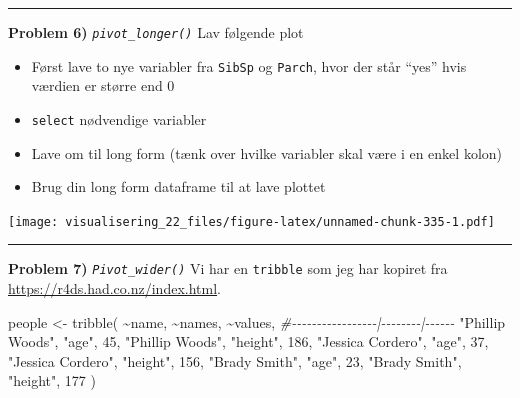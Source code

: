 \documentclass[
]{book}
\newenvironment{Shaded}{\begin{snugshade}}{\end{snugshade}}
\newcommand{\CommentTok}[1]{\textcolor[rgb]{0.56,0.35,0.01}{\textit{#1}}}
\newcommand{\DecValTok}[1]{\textcolor[rgb]{0.00,0.00,0.81}{#1}}
\newcommand{\FunctionTok}[1]{\textcolor[rgb]{0.00,0.00,0.00}{#1}}
\newcommand{\NormalTok}[1]{#1}
\newcommand{\OtherTok}[1]{\textcolor[rgb]{0.56,0.35,0.01}{#1}}
\newcommand{\SpecialCharTok}[1]{\textcolor[rgb]{0.00,0.00,0.00}{#1}}
\newcommand{\StringTok}[1]{\textcolor[rgb]{0.31,0.60,0.02}{#1}}
\providecommand{\tightlist}{%
  \setlength{\itemsep}{0pt}\setlength{\parskip}{0pt}}
\begin{document}
\begin{center}\rule{0.5\linewidth}{0.5pt}\end{center}

\textbf{Problem 6)} \emph{\texttt{pivot\_longer()}} Lav følgende plot

\begin{itemize}
\tightlist
\item
  Først lave to nye variabler fra \texttt{SibSp} og \texttt{Parch}, hvor der står ``yes'' hvis værdien er større end 0
\item
  \texttt{select} nødvendige variabler
\item
  Lave om til long form (tænk over hvilke variabler skal være i en enkel kolon)
\item
  Brug din long form dataframe til at lave plottet
\end{itemize}

\texttt{[image: visualisering\_22\_files/figure-latex/unnamed-chunk-335-1.pdf]}

\begin{center}\rule{0.5\linewidth}{0.5pt}\end{center}

\textbf{Problem 7)} \emph{\texttt{Pivot\_wider()}} Vi har en \texttt{tribble} som jeg har kopiret fra \url{https://r4ds.had.co.nz/index.html}.

\begin{Shaded}
\begin{Highlighting}[]
\NormalTok{people }\OtherTok{\textless{}{-}} \FunctionTok{tribble}\NormalTok{(}
  \SpecialCharTok{\textasciitilde{}}\NormalTok{name,             }\SpecialCharTok{\textasciitilde{}}\NormalTok{names,  }\SpecialCharTok{\textasciitilde{}}\NormalTok{values,}
  \CommentTok{\#{-}{-}{-}{-}{-}{-}{-}{-}{-}{-}{-}{-}{-}{-}{-}{-}{-}|{-}{-}{-}{-}{-}{-}{-}{-}|{-}{-}{-}{-}{-}{-}}
  \StringTok{"Phillip Woods"}\NormalTok{,   }\StringTok{"age"}\NormalTok{,       }\DecValTok{45}\NormalTok{,}
  \StringTok{"Phillip Woods"}\NormalTok{,   }\StringTok{"height"}\NormalTok{,   }\DecValTok{186}\NormalTok{,}
  \StringTok{"Jessica Cordero"}\NormalTok{, }\StringTok{"age"}\NormalTok{,       }\DecValTok{37}\NormalTok{,}
  \StringTok{"Jessica Cordero"}\NormalTok{, }\StringTok{"height"}\NormalTok{,   }\DecValTok{156}\NormalTok{,}
  \StringTok{"Brady Smith"}\NormalTok{,     }\StringTok{"age"}\NormalTok{,       }\DecValTok{23}\NormalTok{,}
  \StringTok{"Brady Smith"}\NormalTok{,     }\StringTok{"height"}\NormalTok{,   }\DecValTok{177}
\NormalTok{)}
\end{Highlighting}
\end{Shaded}
\end{document}
